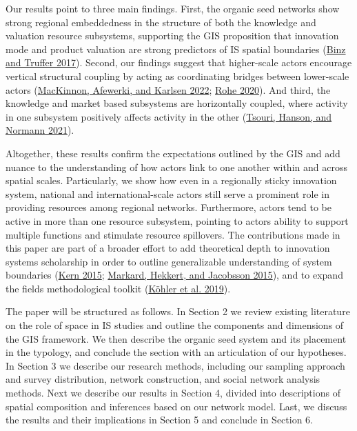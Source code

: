 \documentclass[twoside,12pt,final]{ucthesis-CA2012}
\begin{document}
\begin{ucmainmatter}
Our results point to three main findings. First, the organic seed
networks show strong regional embeddedness in the structure of both the
knowledge and valuation resource subsystems, supporting the GIS
proposition that innovation mode and product valuation are strong
predictors of IS spatial boundaries
(\protect\hyperlink{ref-Binz_Truffer_2017}{Binz and Truffer 2017}). Second,
our findings suggest that higher-scale actors encourage vertical
structural coupling by acting as coordinating bridges between
lower-scale actors
(\protect\hyperlink{ref-MacKinnon_Afewerki_Karlsen_2022}{MacKinnon, Afewerki, and Karlsen 2022}; \protect\hyperlink{ref-Rohe_2020}{Rohe 2020}).
And third, the knowledge and market based subsystems are horizontally
coupled, where activity in one subsystem positively affects activity in
the other
(\protect\hyperlink{ref-Tsouri_Hanson_Normann_2021}{Tsouri, Hanson, and Normann 2021}).

Altogether, these results confirm the expectations outlined by the GIS
and add nuance to the understanding of how actors link to one another
within and across spatial scales. Particularly, we show how even in a
regionally sticky innovation system, national and international-scale
actors still serve a prominent role in providing resources among
regional networks. Furthermore, actors tend to be active in more than
one resource subsystem, pointing to actors\textquotesingle{} ability to support multiple
functions and stimulate resource spillovers. The contributions made in
this paper are part of a broader effort to add theoretical depth to
innovation systems scholarship in order to outline generalizable
understanding of system boundaries
(\protect\hyperlink{ref-Kern_2015}{Kern 2015}; \protect\hyperlink{ref-Markard_Hekkert_Jacobsson_2015}{Markard, Hekkert, and Jacobsson 2015}),
and to expand the field\textquotesingle s methodological toolkit
(\protect\hyperlink{ref-Kuxf6hler_Geels_Kern_Markard_Onsongo_Wieczorek_Alkemade_Avelino_Bergek_Boons_et_al._2019}{Köhler et al. 2019}).

The paper will be structured as follows. In Section 2 we review existing
literature on the role of space in IS studies and outline the components
and dimensions of the GIS framework. We then describe the organic seed
system and its placement in the typology, and conclude the section with
an articulation of our hypotheses. In Section 3 we describe our research
methods, including our sampling approach and survey distribution,
network construction, and social network analysis methods. Next we
describe our results in Section 4, divided into descriptions of spatial
composition and inferences based on our network model. Last, we discuss
the results and their implications in Section 5 and conclude in Section
6.


\end{ucmainmatter}
\end{document}
